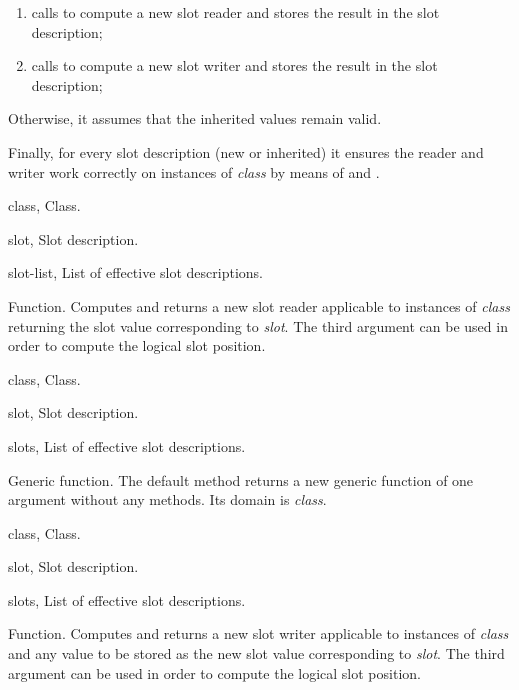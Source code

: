 \begin{optDefinition}
\begin{enumerate}
    \item calls  to compute a new slot reader
    and stores the result in the slot description;

    \item calls  to compute a new slot writer
    and stores the result in the slot description;
\end{enumerate}
%
Otherwise, it assumes that the inherited values remain valid.

Finally, for every slot description (new or inherited) it ensures the reader and
writer work correctly on instances of {\em class} by means of
 and .

%
\begin{genericargs}
    \item[class, \classref{class}] Class.
    \item[slot, \classref{slot}] Slot description.
    \item[slot-list, \classref{list}] List of effective slot descriptions.
\end{genericargs}
%
\result%
Function.
%
\remarks%
Computes and returns a new slot reader applicable to instances of {\em class}
returning the slot value corresponding to {\em slot}. The third
argument can be used in order to compute the logical slot position.

%
\begin{specargs}
    \item[class, \classref{class}] Class.
    \item[slot, \classref{slot}] Slot description.
    \item[slots, \classref{list}] List of effective slot
    descriptions.
\end{specargs}
%
\result%
Generic function.
%
\remarks%
The default method returns a new generic function of one argument
without any methods. Its domain is {\em class}.

%
\begin{genericargs}
    \item[class, \classref{class}] Class.
    \item[slot, \classref{slot}] Slot description.
    \item[slots, \classref{list}] List of effective slot
    descriptions.
\end{genericargs}
%
\result%
Function.
%
\remarks%
Computes and returns a new slot writer applicable to instances of {\em
class} and any value to be stored as the new slot value corresponding
to {\em slot}. The third argument can be used in order to
compute the logical slot position.


\end{optDefinition}
